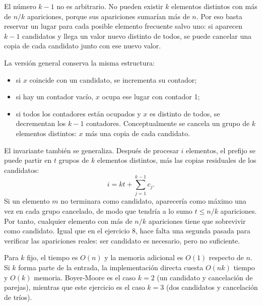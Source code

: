 \documentclass[11pt]{article}
\begin{document}
El número $k-1$ no es arbitrario. No pueden existir $k$ elementos distintos con más de $n/k$ apariciones,
porque sus apariciones sumarían más de $n$. Por eso basta reservar un lugar para cada posible elemento
frecuente salvo uno: si aparecen $k-1$ candidatos y llega un valor nuevo distinto de todos, se puede
cancelar una copia de cada candidato junto con ese nuevo valor.

La versión general conserva la misma estructura:
\begin{itemize}
\item si $x$ coincide con un candidato, se incrementa su contador;
\item si hay un contador vacío, $x$ ocupa ese lugar con contador 1;
\item si todos los contadores están ocupados y $x$ es distinto de todos, se decrementan los $k-1$
contadores. Conceptualmente se cancela un grupo de $k$ elementos distintos: $x$ más una copia de cada
candidato.
\end{itemize}

El invariante también se generaliza. Después de procesar $i$ elementos, el prefijo se puede partir en
$t$ grupos de $k$ elementos distintos, más las copias residuales de los candidatos:
\[
i=kt+\sum_{j=1}^{k-1}c_j.
\]
Si un elemento $m$ no terminara como candidato, aparecería como máximo una vez en cada grupo cancelado,
de modo que tendría a lo sumo $t\le n/k$ apariciones. Por tanto, cualquier elemento con más de $n/k$
apariciones tiene que sobrevivir como candidato. Igual que en el ejercicio 8, hace falta una segunda pasada
para verificar las apariciones reales: ser candidato es necesario, pero no suficiente.

Para $k$ fijo, el tiempo es $O(n)$ y la memoria adicional es $O(1)$ respecto de $n$. Si $k$ forma parte
de la entrada, la implementación directa cuesta $O(nk)$ tiempo y $O(k)$ memoria. Boyer-Moore es el caso
$k=2$ (un candidato y cancelación de parejas), mientras que este ejercicio es el caso $k=3$ (dos candidatos
y cancelación de tríos).
\end{document}

